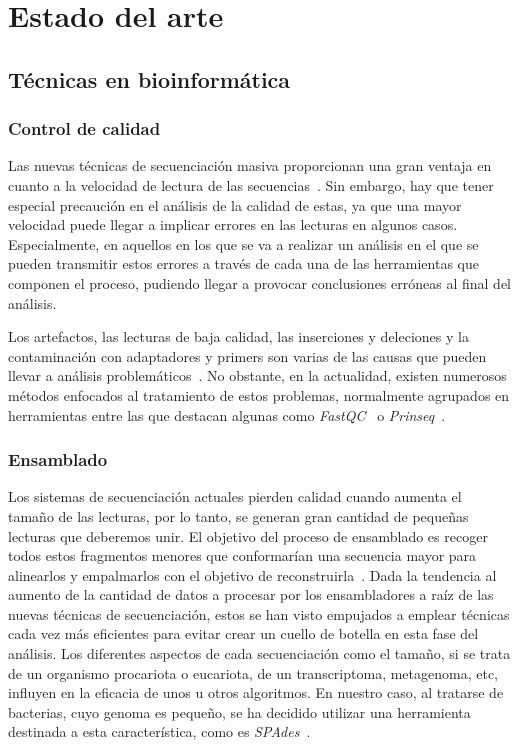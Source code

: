\chapter{Estado del arte}
\label{chap:estadodelarte}

\section{Técnicas en bioinformática}
\subsection{Control de calidad}
Las nuevas técnicas de secuenciación masiva proporcionan una gran ventaja en cuanto a la velocidad de lectura de las secuencias~\cite{ngs}. Sin embargo, hay que tener especial precaución en el análisis de la calidad de estas, ya que una mayor velocidad puede llegar a implicar errores en las lecturas en algunos casos. Especialmente, en aquellos en los que se va a realizar un análisis en el que se pueden transmitir estos errores a través de cada una de las herramientas que componen el proceso, pudiendo llegar a provocar conclusiones erróneas al final del análisis.

Los artefactos, las lecturas de baja calidad, las inserciones y deleciones y la contaminación con adaptadores y primers son varias de las causas que pueden llevar a análisis problemáticos~\cite{plosone}. No obstante, en la actualidad, existen numerosos métodos enfocados al tratamiento de estos problemas, normalmente agrupados en herramientas entre las que destacan algunas como \textit{FastQC}~\cite{fastqc} o \textit{Prinseq}~\cite{schmieder_prinseq}.

\subsection{Ensamblado}
Los sistemas de secuenciación actuales pierden calidad cuando aumenta el tamaño de las lecturas, por lo tanto, se generan gran cantidad de pequeñas lecturas que deberemos unir. El objetivo del proceso de ensamblado es recoger todos estos fragmentos menores que conformarían una secuencia mayor para alinearlos y empalmarlos con el objetivo de reconstruirla~\cite{assembly_wiki}. Dada la tendencia al aumento de la cantidad de datos a procesar por los ensambladores a raíz de las nuevas técnicas de secuenciación, estos se han visto empujados a emplear técnicas cada vez más eficientes para evitar crear un cuello de botella en esta fase del análisis. Los diferentes aspectos de cada secuenciación como el tamaño, si se trata de un organismo procariota o eucariota, de un transcriptoma, metagenoma, etc, influyen en la eficacia de unos u otros algoritmos. En nuestro caso, al tratarse de bacterias, cuyo genoma es pequeño, se ha decidido utilizar una herramienta destinada a esta característica, como es \textit{SPAdes}~\cite{Nurk2013}. 

